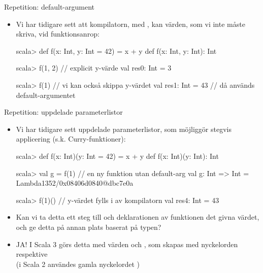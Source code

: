 \begin{Slide}{Repetition: default-argument}\SlideFontSmall
\begin{itemize}\SlideFontSmall
\item Vi har tidigare sett att kompilatorn, med , kan  värden, som vi inte måste skriva, vid funktionsanrop:
\begin{REPLnonum}
scala> def f(x: Int, y: Int = 42) = x + y
def f(x: Int, y: Int): Int

scala> f(1, 2)        // explicit y-värde
val res0: Int = 3

scala> f(1)          // vi kan också skippa y-värdet  
val res1: Int = 43   // då används default-argumentet
\end{REPLnonum}
\end{itemize}
\end{Slide}


\begin{Slide}{Repetition: uppdelade parameterlistor}\SlideFontSmall
\begin{itemize}\SlideFontSmall
\item Vi har tidigare sett uppdelade parameterlistor, som möjliggör stegvis applicering (s.k. Curry-funktioner):
\begin{REPLsmall}
scala> def f(x: Int)(y: Int = 42) = x + y
def f(x: Int)(y: Int): Int

scala> val g = f(1)  // en ny funktion utan default-arg
val g: Int => Int = Lambda1352/0x08406d0840@dbc7e0a

scala> f(1)()   // y-värdet fylls i av kompilatorn
val res4: Int = 43
\end{REPLsmall}
\pause
\item  Kan vi ta detta ett steg till och  deklarationen av funktionen  det givna värdet, och ge detta på annan plats baserat på typen?
\pause 
\item JA! I Scala 3 görs detta med  värden och , som skapas med nyckelorden  respektive \\(i Scala 2 användes gamla nyckelordet )
\end{itemize}
\end{Slide}

